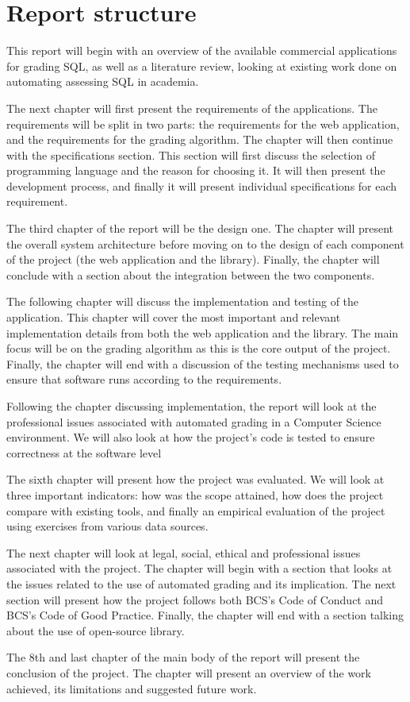 \section{Report structure}

This report will begin with an overview of the available commercial applications for grading SQL, as well as a literature review, looking at existing work done on automating assessing SQL in academia.

The next chapter will first present the requirements of the applications. The requirements will be split in two parts: the requirements for the web application, and the requirements for the grading algorithm. The chapter will then continue with the specifications section. This section will first discuss the selection of programming language and the reason for choosing it. It will then present the development process, and finally it will present individual specifications for each requirement.

The third chapter of the report will be the design one. The chapter will present the overall system architecture before moving on to the design of each component of the project (the web application and the library). Finally, the chapter will conclude with a section about the integration between the two components.

The following chapter will discuss the implementation and testing of the application. This chapter will cover the most important and relevant implementation details from both the web application and the library. The main focus will be on the grading algorithm as this is the core output of the project. Finally, the chapter will end with a discussion of the testing mechanisms used to ensure that software runs according to the requirements.

Following the chapter discussing implementation, the report will look at the professional issues associated with automated grading in a Computer Science environment. We will also look at how the project's code is tested to ensure correctness at the software level

The sixth chapter will present how the project was evaluated. We will look at three important indicators: how was the scope attained, how does the project compare with existing tools, and finally an empirical evaluation of the project using exercises from various data sources.

The next chapter will look at legal, social, ethical and professional issues associated with the project. The chapter will begin with a section that looks at the issues related to the use of automated grading and its implication. The next section will present how the project follows both BCS's Code of Conduct and BCS's Code of Good Practice. Finally, the chapter will end with a section talking about the use of open-source library.

The 8th and last chapter of the main body of the report will present the conclusion of the project. The chapter will present an overview of the work achieved, its limitations and suggested future work.